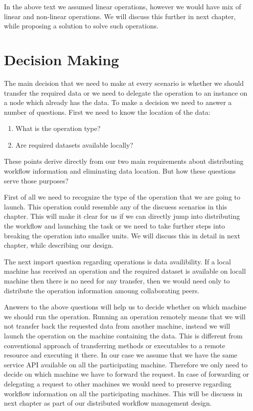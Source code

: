 In the above text we assumed linear operations, however we would have mix of linear and non-linear operations. 
We will discuss this further in next chapter, while proposing a solution to solve such operations.


\section{Decision Making}
The main decision that we need to make at every scenario is whether we should transfer the required data or we
need to delegate the operation to an instance on a node which already has the data. To make a decision we need to
answer a number of questions. First we need to know the location of the data:

\begin{enumerate}
\item What is the operation type?
\item Are required datasets available locally?
\end{enumerate}

These points derive directly from our two main requirements about distributing workflow information and 
eliminating data location. But how these questions serve those purposes?

First of all we need to recognize the type of the operation that we are going to launch. This operation could
resemble any of the discuess scenarios in this chapter. This will make it clear for us if we can directly
jump into distributing the workflow and launching the task or we need to take further steps into breaking
the operation into smaller units. We will discuss this in detail in next chapter, whilc describing our design.

The next import question regarding operations is data availibility. If a local machine has received an operation
and the required dataset is available on locall machine then there is no need for any transfer, then we would need
only to distribute the operation information amoung collaborating peers.

Answers to the above questions will help us to decide whether on which machine we should run the operation. Running an
operation remotely means that we will not transfer back the requested data from another machine, instead we will launch
the operation on the machine containing the data. This is different from conventional approach of transferring methods
or executables to a remote resource and executing it there. In our case we assume that we have the same service API 
available on all the participating machine. Therefore we only need to decide on which machine we have to forward
the request. In case of forwarding or delegating a request to other machines we would need to preserve regarding
workflow information on all the participating machines. This will be discuess in next chapter as part of our
distributed workflow management design.


